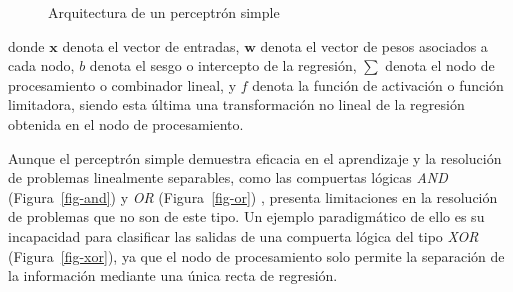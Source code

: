 \documentclass[
  us-letterpaper,
]{scrreprt}
\theoremstyle{plain}
\theoremstyle{definition}
\theoremstyle{plain}
\theoremstyle{definition}
\theoremstyle{remark}
\begin{document}
\begin{figure}


\caption{\label{fig-arqper}Arquitectura de un perceptrón simple}

\end{figure}%

donde \(\mathbf x\) denota el vector de entradas, \(\mathbf w\) denota
el vector de pesos asociados a cada nodo, \(b\) denota el sesgo o
intercepto de la regresión, \(\sum\) denota el nodo de procesamiento o
combinador lineal, y \(f\) denota la función de activación o función
limitadora, siendo esta última una transformación no lineal de la
regresión obtenida en el nodo de procesamiento.

Aunque el perceptrón simple demuestra eficacia en el aprendizaje y la
resolución de problemas linealmente separables, como las compuertas
lógicas \emph{AND} (Figura~\ref{fig-and}) y \emph{OR}
(Figura~\ref{fig-or}) , presenta limitaciones en la resolución de
problemas que no son de este tipo. Un ejemplo paradigmático de ello es
su incapacidad para clasificar las salidas de una compuerta lógica del
tipo \emph{XOR} (Figura~\ref{fig-xor}), ya que el nodo de procesamiento
solo permite la separación de la información mediante una única recta de
regresión.
\end{document}
